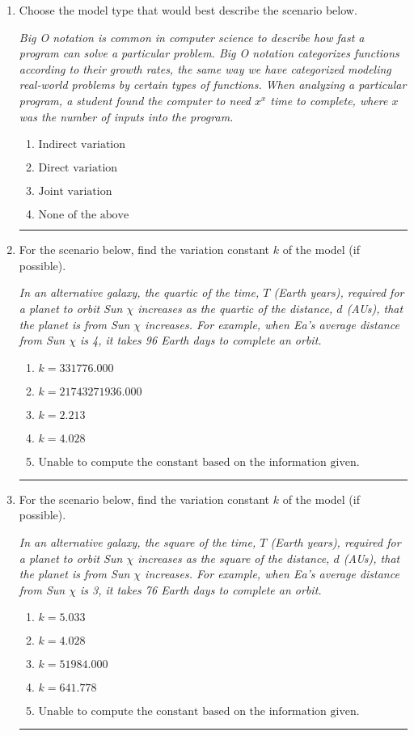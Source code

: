 \documentclass[14pt]{extbook}
\newcommand{\litem}[1]{\item#1\hspace*{-1cm}\rule{\textwidth}{0.4pt}}
\begin{document}
\begin{enumerate}
\litem{
Choose the model type that would best describe the scenario below.
\begin{center}
    \textit{ Big O notation is common in computer science to describe how fast a program can solve a particular problem. Big O notation categorizes functions according to their growth rates, the same way we have categorized modeling real-world problems by certain types of functions. When analyzing a particular program, a student found the computer to need $x^x$ time to complete, where $x$ was the number of inputs into the program. }
\end{center}
\begin{enumerate}[label=\Alph*.]
\item \( \text{Indirect variation} \)
\item \( \text{Direct variation} \)
\item \( \text{Joint variation} \)
\item \( \text{None of the above} \)

\end{enumerate} }
\litem{
For the scenario below, find the variation constant $k$ of the model (if possible).
\begin{center}
    \textit{ In an alternative galaxy, the quartic of the time, $T$ (Earth years), required for a planet to orbit Sun $\chi$ increases as the quartic of the distance, $d$ (AUs), that the planet is from Sun $\chi$ increases. For example, when Ea's average distance from Sun $\chi$ is 4, it takes 96 Earth days to complete an orbit. }
\end{center}
\begin{enumerate}[label=\Alph*.]
\item \( k = 331776.000 \)
\item \( k = 21743271936.000 \)
\item \( k = 2.213 \)
\item \( k = 4.028 \)
\item \( \text{Unable to compute the constant based on the information given.} \)

\end{enumerate} }
\litem{
For the scenario below, find the variation constant $k$ of the model (if possible).
\begin{center}
    \textit{ In an alternative galaxy, the square of the time, $T$ (Earth years), required for a planet to orbit Sun $\chi$ increases as the square of the distance, $d$ (AUs), that the planet is from Sun $\chi$ increases. For example, when Ea's average distance from Sun $\chi$ is 3, it takes 76 Earth days to complete an orbit. }
\end{center}
\begin{enumerate}[label=\Alph*.]
\item \( k = 5.033 \)
\item \( k = 4.028 \)
\item \( k = 51984.000 \)
\item \( k = 641.778 \)
\item \( \text{Unable to compute the constant based on the information given.} \)


\end{enumerate}}
\end{enumerate}
\end{document}
